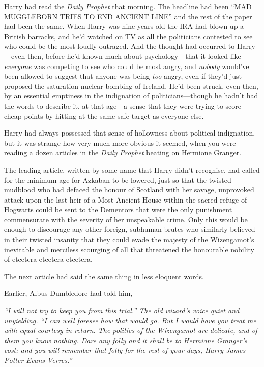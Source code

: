 Harry had read the \emph{Daily Prophet} that morning. The headline had
been ``MAD MUGGLEBORN TRIES TO END ANCIENT LINE'' and the rest of the
paper had been the same. When Harry was nine years old the IRA had blown
up a British barracks, and he'd watched on TV as all the politicians
contested to see who could be the most loudly outraged. And the thought
had occurred to Harry---even then, before he'd known much about
psychology---that it looked like \emph{everyone} was competing to see
who could be most angry, and \emph{nobody} would've been allowed to
suggest that anyone was being \emph{too} angry, even if they'd just
proposed the saturation nuclear bombing of Ireland. He'd been struck,
even then, by an essential emptiness in the indignation of
politicians---though he hadn't had the words to describe it, at that
age---a sense that they were trying to score cheap points by hitting at
the same safe target as everyone else.

Harry had always possessed that sense of hollowness about political
indignation, but it was strange how very much more obvious it seemed,
when you were reading a dozen articles in the \emph{Daily Prophet}
beating on Hermione Granger.

The leading article, written by some name that Harry didn't recognise,
had called for the minimum age for Azkaban to be lowered, just so that
the twisted mudblood who had defaced the honour of Scotland with her
savage, unprovoked attack upon the last heir of a Most Ancient House
within the sacred refuge of Hogwarts could be sent to the Dementors that
were the only punishment commensurate with the severity of her
unspeakable crime. Only this would be enough to discourage any other
foreign, subhuman brutes who similarly believed in their twisted
insanity that they could evade the majesty of the Wizengamot's
inevitable and merciless scourging of all that threatened the honourable
nobility of etcetera etcetera etcetera.

The next article had said the same thing in less eloquent words.

Earlier, Albus Dumbledore had told him,

\emph{``I will not try to keep you from this trial.'' The old wizard's
voice quiet and unyielding. ``I can well foresee how that would go. But
I would have you treat me with equal courtesy in return. The politics of
the Wizengamot are delicate, and of them you know nothing. Dare any
folly and it shall be to Hermione Granger's cost; and you will remember
that folly for the rest of your days, Harry James
Potter-Evans-Verres.''}

